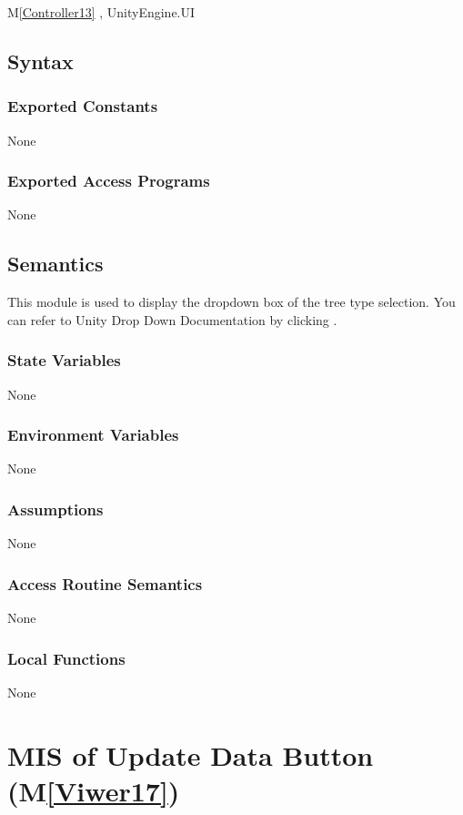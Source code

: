 \documentclass[12pt, titlepage]{article}
\newcommand{\mref}[1]{M\ref{#1}}
\begin{document}
\mref{Controller13} , UnityEngine.UI

\subsection{Syntax}

\subsubsection{Exported Constants}
None
\subsubsection{Exported Access Programs}
None

\subsection{Semantics}
This module is used to display the dropdown box of the tree type
selection. You can refer to Unity Drop Down Documentation 
by clicking \dref.

\subsubsection{State Variables}
None
\subsubsection{Environment Variables}
None
\subsubsection{Assumptions}
None
\subsubsection{Access Routine Semantics}
None
\subsubsection{Local Functions}
None


\newpage

\section{MIS of Update Data Button (\mref{Viwer17})}
\end{document}
